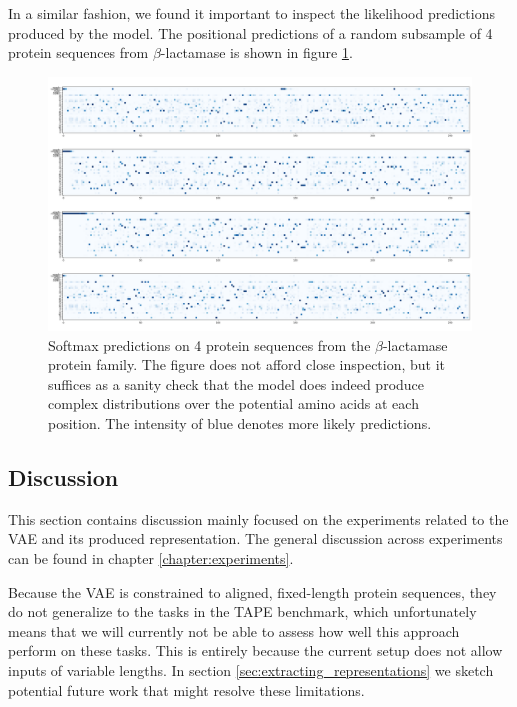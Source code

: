 In a similar fashion, we found it important to inspect the likelihood predictions produced by the model. The positional predictions of a random subsample of 4 protein sequences from $\beta$-lactamase is shown in figure \ref{fig:softmax}.
\begin{figure}[H]
    \centering
    \includegraphics[width = 0.9\linewidth]{report/figures/softmax.png}
    \caption{Softmax predictions on 4 protein sequences from the $\beta$-lactamase protein family. The figure does not afford close inspection, but it suffices as a sanity check that the model does indeed produce complex distributions over the potential amino acids at each position. The intensity of blue denotes more likely predictions.}
    \label{fig:softmax}
\end{figure}

\subsection{Discussion}
\label{sec:vae_results_discussion}

This section contains discussion mainly focused on the experiments related to the VAE and its produced representation. The general discussion across experiments can be found in chapter \ref{chapter:experiments}.

Because the VAE is constrained to aligned, fixed-length protein sequences, they do not generalize to the tasks in the TAPE benchmark, which unfortunately means that we will currently not be able to assess how well this approach perform on these tasks. This is entirely because the current setup does not allow inputs of variable lengths. In section \ref{sec:extracting_representations} we sketch potential future work that might resolve these limitations.

